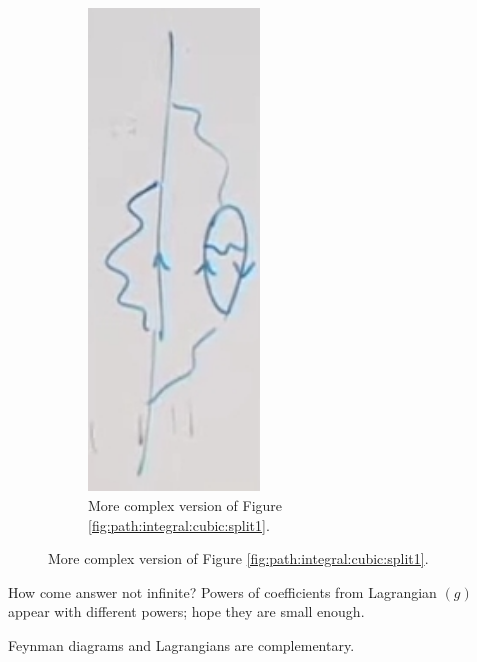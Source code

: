 \documentclass[]{article}
\begin{document}
\begin{figure}[H]
\begin{subfigure}{0.4\textwidth}
		\caption{More complex version of Figure \ref{fig:path:integral:cubic:split1}.}\label{fig:path:integral:cubic:split2}
		\includegraphics[width=0.5\textwidth]{path-integral-cubic-split2}
	\end{subfigure}
\end{figure}

How come answer not infinite? Powers of coefficients from Lagrangian $(g)$ appear with different powers; hope they are small enough.

Feynman diagrams and Lagrangians are complementary.



\end{document}
